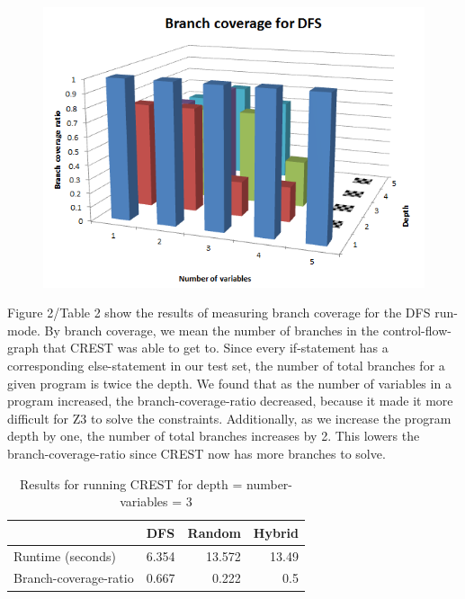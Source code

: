 \documentclass[oribibl, twocolumn]{llncs}
\begin{document}
\begin{figure}[!t]
\centering
\includegraphics[width=13cm]{dfs_branch_coverage}
\caption{}
\label{figure:motivation}
\end{figure}

Figure 2/Table 2 show the results of measuring branch coverage for the DFS run-mode. By branch coverage, we mean the number of branches in the control-flow-graph that CREST was able to get to. Since every if-statement has a corresponding else-statement in our test set, the number of total branches for a given program is twice the depth. We found that as the number of variables in a program increased, the branch-coverage-ratio decreased, because it made it more difficult for Z3 to solve the constraints. Additionally, as we increase the program depth by one, the number of total branches increases by 2. This lowers the branch-coverage-ratio since CREST now has more branches to solve.

\begin{table}[htbp]
\caption{Results for running CREST for depth = number-variables = 3}
\begin{center}
\begin{tabular}{|l|r|r|r|}
\hline
 & \multicolumn{1}{l|}{DFS} & \multicolumn{1}{l|}{Random} & \multicolumn{1}{l|}{Hybrid} \\ \hline
Runtime (seconds) & 6.354 & 13.572 & 13.49 \\ \hline
Branch-coverage-ratio & 0.667 & 0.222 & 0.5 \\ \hline
\end{tabular}
\end{center}
\label{DFS timings (in seconds)}
\end{table}
\end{document}
